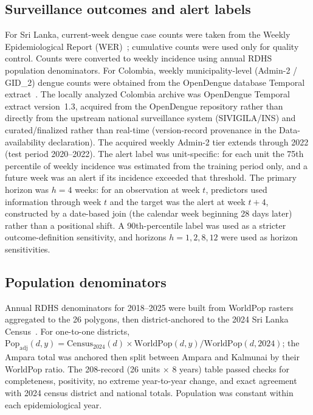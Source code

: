 \documentclass[11pt,a4paper]{article}
\begin{document}
\subsection{Surveillance outcomes and alert labels}
For Sri Lanka, current-week dengue case counts were taken from the Weekly Epidemiological Report (WER)~\cite{SriLankaWER}; cumulative counts were used only for quality control. Counts were converted to weekly incidence using annual RDHS population denominators. For Colombia, weekly municipality-level (Admin-2 / GID\_2) dengue counts were obtained from the OpenDengue database Temporal extract~\cite{Clarke2024OpenDengue,OpenDengue2024}. The locally analyzed Colombia archive was OpenDengue Temporal extract version~1.3, acquired from the OpenDengue repository rather than directly from the upstream national surveillance system (SIVIGILA/INS) and curated/finalized rather than real-time (version-record provenance in the Data-availability declaration). The acquired weekly Admin-2 tier extends through 2022 (test period 2020--2022). The alert label was unit-specific: for each unit the 75th percentile of weekly incidence was estimated from the training period only, and a future week was an alert if its incidence exceeded that threshold. The primary horizon was $h=4$ weeks: for an observation at week $t$, predictors used information through week $t$ and the target was the alert at week $t+4$, constructed by a date-based join (the calendar week beginning 28 days later) rather than a positional shift. A 90th-percentile label was used as a stricter outcome-definition sensitivity, and horizons $h=1,2,8,12$ were used as horizon sensitivities.

\subsection{Population denominators}
Annual RDHS denominators for 2018--2025 were built from WorldPop rasters~\cite{Tatem2017,WorldPop2025} aggregated to the 26 polygons, then district-anchored to the 2024 Sri Lanka Census~\cite{SriLankaCensus2025}. For one-to-one districts, $\mathrm{Pop}_{\mathrm{adj}}(d,y)=\mathrm{Census}_{2024}(d)\times \mathrm{WorldPop}(d,y)/\mathrm{WorldPop}(d,2024)$; the Ampara total was anchored then split between Ampara and Kalmunai by their WorldPop ratio. The 208-record (26 units $\times$ 8 years) table passed checks for completeness, positivity, no extreme year-to-year change, and exact agreement with 2024 census district and national totals. Population was constant within each epidemiological year.
\end{document}
